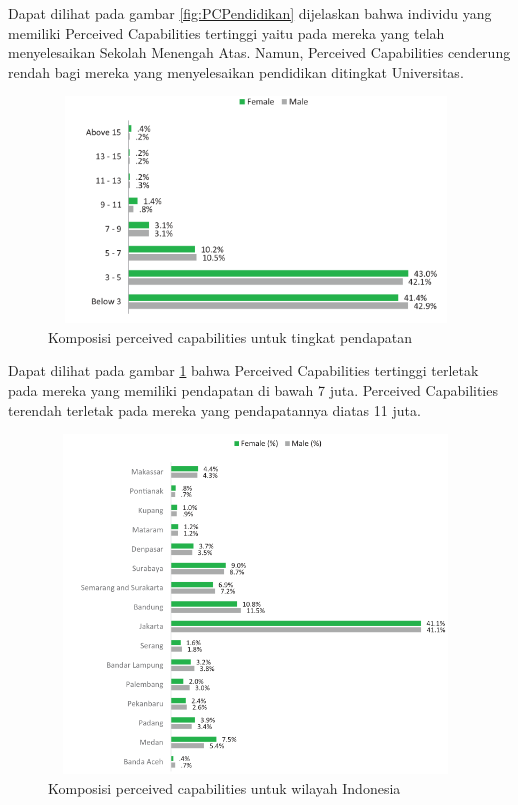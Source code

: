 \begin{enumerate}
Dapat dilihat pada gambar \ref{fig:PCPendidikan} dijelaskan bahwa individu yang memiliki Perceived Capabilities tertinggi yaitu pada mereka yang telah menyelesaikan Sekolah Menengah Atas. Namun, Perceived Capabilities cenderung rendah bagi mereka yang menyelesaikan pendidikan ditingkat Universitas.

\begin{figure} [H]
	\centering  
	\includegraphics[width=11cm, height=6cm]{pendapatanPC2013} 
	\caption[Komposisi perceived capabilities untuk tingkat pendapatan]{Komposisi perceived capabilities untuk tingkat pendapatan} 
	\label{fig:PCPendapatan} 
\end{figure}


Dapat dilihat pada gambar \ref{fig:PCPendapatan} bahwa Perceived Capabilities tertinggi terletak pada mereka yang memiliki pendapatan di bawah 7 juta. Perceived Capabilities terendah terletak pada mereka yang pendapatannya diatas 11 juta.


\begin{figure} [H]
	\centering  
	\includegraphics[width=11cm, height=9cm]{lokasiPC2013} 
	\caption[Komposisi perceived capabilities untuk wilayah Indonesia]{Komposisi perceived capabilities untuk wilayah Indonesia} 
	\label{fig:PCRegion} 
\end{figure}



\end{enumerate}
